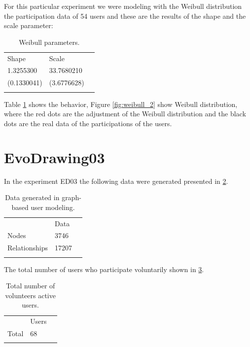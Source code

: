 For this particular experiment we were modeling with the Weibull distribution
\cite{weibull1951wide} the participation data of 54 users and these are the
results of the shape and the scale parameter:

\begin{table}
\small
\caption{Weibull parameters.}
\label{tab:weibullp_2}
\centering
\small
\begin{tabular}{p{3cm} p{3cm} p{3cm} }
\hline\noalign{\smallskip}
Shape  & Scale &  \\
\noalign{\smallskip}\hline\noalign{\smallskip}
\small{1.3255300} & \small{33.7680210} & \\ \hline
\small{(0.1330041)} & \small{(3.6776628)} & \\ \hline

\noalign{\smallskip}\hline
\end{tabular}
\end{table}

Table \ref{tab:weibullp_2} shows the behavior, Figure
\ref{fig:weibull_2} show Weibull distribution, where the red dots are the adjustment of the Weibull
distribution and the black dots are the real data of the participations of the
users.




\section{EvoDrawing03}
In the experiment ED03 the following data were
generated presented in \ref{tab:dataGenerated_3}.

\begin{table}
\small
\caption{Data generated in graph-based user modeling.}
\label{tab:dataGenerated_3}
\centering
\small
\begin{tabular}{p{3cm} p{3cm} p{3cm} }
\hline\noalign{\smallskip}
  & Data &  \\
\noalign{\smallskip}\hline\noalign{\smallskip}
\small{Nodes} & \small{3746 } & \\ \hline
\small{Relationships} & \small{17207 } & \\ \hline

\noalign{\smallskip}\hline
\end{tabular}
\end{table}

The total number of users who participate voluntarily shown in \ref{tab:totalUsers_3}.

\begin{table}
\small
\caption{Total number of volunteers active users.}
\label{tab:totalUsers_3}
\centering
\small
\begin{tabular}{p{3cm} p{3cm} p{3cm} }
\hline\noalign{\smallskip}
  & Users &  \\
\noalign{\smallskip}\hline\noalign{\smallskip}
\small{Total } & \small{68} & \\ \hline
\noalign{\smallskip}\hline
\end{tabular}
\end{table}

